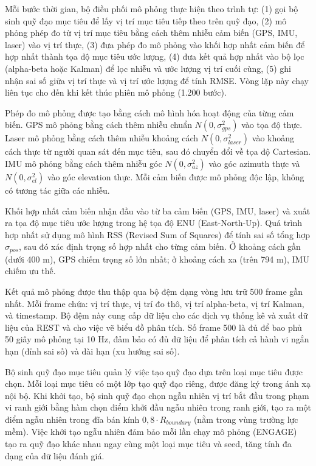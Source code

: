 Mỗi bước thời gian, bộ điều phối mô phỏng thực hiện theo trình tự: (1) gọi bộ sinh quỹ đạo mục tiêu để lấy vị trí mục tiêu tiếp theo trên quỹ đạo, (2) mô phỏng phép đo từ vị trí mục tiêu bằng cách thêm nhiễu cảm biến (GPS, IMU, laser) vào vị trí thực, (3) đưa phép đo mô phỏng vào khối hợp nhất cảm biến để hợp nhất thành tọa độ mục tiêu ước lượng, (4) đưa kết quả hợp nhất vào bộ lọc (alpha-beta hoặc Kalman) để lọc nhiễu và ước lượng vị trí cuối cùng, (5) ghi nhận sai số giữa vị trí thực và vị trí ước lượng để tính RMSE. Vòng lặp này chạy liên tục cho đến khi kết thúc phiên mô phỏng (1.200 bước).

Phép đo mô phỏng được tạo bằng cách mô hình hóa hoạt động của từng cảm biến. GPS mô phỏng bằng cách thêm nhiễu chuẩn $N(0, \sigma_{gps}^2)$ vào tọa độ thực. Laser mô phỏng bằng cách thêm nhiễu khoảng cách $N(0, \sigma_{laser}^2)$ vào khoảng cách thực từ người quan sát đến mục tiêu, sau đó chuyển đổi về tọa độ Cartesian. IMU mô phỏng bằng cách thêm nhiễu góc $N(0, \sigma_{az}^2)$ vào góc azimuth thực và $N(0, \sigma_{el}^2)$ vào góc elevation thực. Mỗi cảm biến được mô phỏng độc lập, không có tương tác giữa các nhiễu.

Khối hợp nhất cảm biến nhận đầu vào từ ba cảm biến (GPS, IMU, laser) và xuất ra tọa độ mục tiêu ước lượng trong hệ tọa độ ENU (East-North-Up). Quá trình hợp nhất sử dụng mô hình RSS (Revised Sum of Squares) để tính sai số tổng hợp $\sigma_{pos}$, sau đó xác định trọng số hợp nhất cho từng cảm biến. Ở khoảng cách gần (dưới 400 m), GPS chiếm trọng số lớn nhất; ở khoảng cách xa (trên 794 m), IMU chiếm ưu thế.

Kết quả mô phỏng được thu thập qua bộ đệm dạng vòng lưu trữ 500 frame gần nhất. Mỗi frame chứa: vị trí thực, vị trí đo thô, vị trí alpha-beta, vị trí Kalman, và timestamp. Bộ đệm này cung cấp dữ liệu cho các dịch vụ thống kê và xuất dữ liệu của REST và cho việc vẽ biểu đồ phân tích. Số frame 500 là đủ để bao phủ 50 giây mô phỏng tại 10 Hz, đảm bảo có đủ dữ liệu để phân tích cả hành vi ngắn hạn (đỉnh sai số) và dài hạn (xu hướng sai số).

Bộ sinh quỹ đạo mục tiêu quản lý việc tạo quỹ đạo dựa trên loại mục tiêu được chọn. Mỗi loại mục tiêu có một lớp tạo quỹ đạo riêng, được đăng ký trong ánh xạ nội bộ. Khi khởi tạo, bộ sinh quỹ đạo chọn ngẫu nhiên vị trí bắt đầu trong phạm vi ranh giới bằng hàm chọn điểm khởi đầu ngẫu nhiên trong ranh giới, tạo ra một điểm ngẫu nhiên trong đĩa bán kính $0{,}8 \cdot R_{boundary}$ (nằm trong vùng trường lực mềm). Việc khởi tạo ngẫu nhiên đảm bảo mỗi lần chạy mô phỏng (ENGAGE) tạo ra quỹ đạo khác nhau ngay cùng một loại mục tiêu và seed, tăng tính đa dạng của dữ liệu đánh giá.

